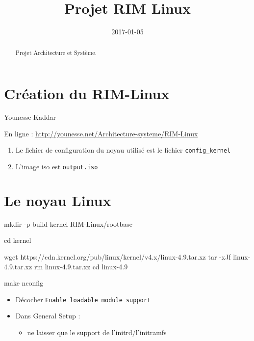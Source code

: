 \documentclass[]{article}
\title{Projet RIM Linux}
\date{2017-01-05}
\newenvironment{Shaded}{}{}
\newcommand{\FunctionTok}[1]{\textcolor[rgb]{0.02,0.16,0.49}{{#1}}}
\newcommand{\BuiltInTok}[1]{{#1}}
\newcommand{\NormalTok}[1]{{#1}}
\providecommand{\tightlist}{%
  \setlength{\itemsep}{0pt}\setlength{\parskip}{0pt}}
\begin{document}
\maketitle
\begin{abstract}
Projet Architecture et Système.
\end{abstract}

\section{Création du RIM-Linux}\label{cruxe9ation-du-rim-linux}

Younesse Kaddar

En ligne : \url{http://younesse.net/Architecture-systeme/RIM-Linux}

\begin{enumerate}
\def\labelenumi{\arabic{enumi}.}
\item
  Le fichier de configuration du noyau utilisé est le fichier
  \texttt{config\_kernel}
\item
  L'image iso est \texttt{output.iso}
\end{enumerate}

\section{Le noyau Linux}\label{le-noyau-linux}

\begin{Shaded}
\begin{Highlighting}[]
\FunctionTok{mkdir} \NormalTok{-p build kernel RIM-Linux/rootbase}

\BuiltInTok{cd} \NormalTok{kernel}

\FunctionTok{wget} \NormalTok{https://cdn.kernel.org/pub/linux/kernel/v4.x/linux-4.9.tar.xz}
\FunctionTok{tar} \NormalTok{-xJf linux-4.9.tar.xz}
\FunctionTok{rm} \NormalTok{linux-4.9.tar.xz}
\BuiltInTok{cd} \NormalTok{linux-4.9}

\FunctionTok{make} \NormalTok{nconfig}
\end{Highlighting}
\end{Shaded}

\begin{itemize}
\item
  Décocher \texttt{Enable\ loadable\ module\ support}
\item
  Dans General Setup :

  \begin{itemize}
  \tightlist
  \item
    ne laisser que le support de l'initrd/l'initramfs
  \end{itemize}
\end{itemize}
\end{document}
